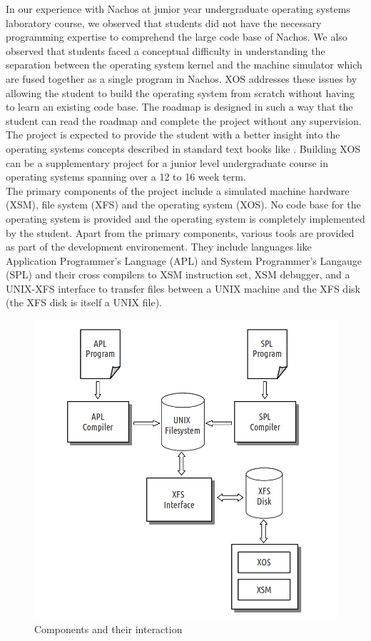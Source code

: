 \documentclass{sig-alternate}
\begin{document}
In our experience with Nachos at junior year undergraduate operating systems laboratory course, we observed that students did not have the necessary programming expertise to comprehend the large code base of Nachos.  We also observed that students faced a conceptual difficulty in understanding the separation between the operating system kernel and the machine simulator which are fused together as a single program in Nachos. XOS addresses these issues by allowing the student to build the operating system from scratch without having to learn an existing code base. The roadmap is designed in such a way that the student can read the roadmap and complete the project without any supervision. The project is expected to provide the student with a better insight into the operating systems concepts described in standard text books like \cite{silberschatz}. Building XOS can be a supplementary project for a junior level undergraduate course in operating systems spanning over a 12 to 16 week term. \\

The primary components of the project include a simulated machine hardware (XSM), file system (XFS) and the operating system (XOS). No code base for the operating system is provided and the operating system is completely implemented by the student. Apart from the primary components, various tools are provided as part of the development environement. They include languages like Application Programmer's Language (APL) and System Programmer's Langauge (SPL) and their cross compilers to XSM instruction set, XSM debugger, and a UNIX-XFS interface to transfer files between a UNIX machine and the XFS disk (the XFS disk is itself a UNIX file). 

\begin{figure}[hbtp]
\centering
\includegraphics[scale=0.42]{components.png}
\caption{Components and their interaction}
\end{figure}
\end{document}
